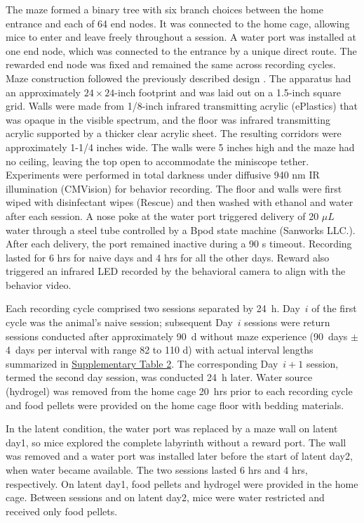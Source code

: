 \documentclass[fleqn,10pt]{wlscirep}
\begin{document}
The maze formed a binary tree with six branch choices between the home entrance and each of 64 end nodes. It was connected to the home cage, allowing mice to enter and leave freely throughout a session. A water port was installed at one end node, which was connected to the entrance by a unique direct route. The rewarded end node was fixed and remained the same across recording cycles. Maze construction followed the previously described design \cite{rosenberg_mice_2021}. The apparatus had an approximately $24\times24$-inch footprint and was laid out on a 1.5-inch square grid. Walls were made from 1/8-inch infrared transmitting acrylic (ePlastics) that was opaque in the visible spectrum, and the floor was infrared transmitting acrylic supported by a thicker clear acrylic sheet. The resulting corridors were approximately 1-1/4 inches wide. The walls were 5 inches high and the maze had no ceiling, leaving the top open to accommodate the miniscope tether. Experiments were performed in total darkness under diffusive 940 nm IR illumination (CMVision) for behavior recording. The floor and walls were first wiped with disinfectant wipes (Rescue) and then washed with ethanol and water after each session. A nose poke at the water port triggered delivery of 20 $\mu L$ water through a steel tube controlled by a Bpod state machine (Sanworks LLC.). After each delivery, the port remained inactive during a 90 s timeout. Recording lasted for 6 hrs for naive days and 4 hrs for all the other days. Reward also triggered an infrared LED recorded by the behavioral camera to align with the behavior video.

Each recording cycle comprised two sessions separated by 24~h. Day~$i$ of the first cycle was the animal's naive session; subsequent Day~$i$ sessions were return sessions conducted after approximately 90~d without maze experience (90~days $\pm$ 4~days per interval with range 82 to 110 d) with actual interval lengths summarized in \hyperlink{supp-table-2}{Supplementary Table 2}. The corresponding Day~$i+1$ session, termed the second day session, was conducted 24~h later. Water source (hydrogel) was removed from the home cage 20~hrs prior to each recording cycle and food pellets were provided on the home cage floor with bedding materials.  

In the latent condition, the water port was replaced by a maze wall on latent day1, so mice explored the complete labyrinth without a reward port. The wall was removed and a water port was installed later before the start of latent day2, when water became available. The two sessions lasted 6 hrs and 4 hrs, respectively. On latent day1, food pellets and hydrogel were provided in the home cage. Between sessions and on latent day2, mice were water restricted and received only food pellets.
\end{document}
